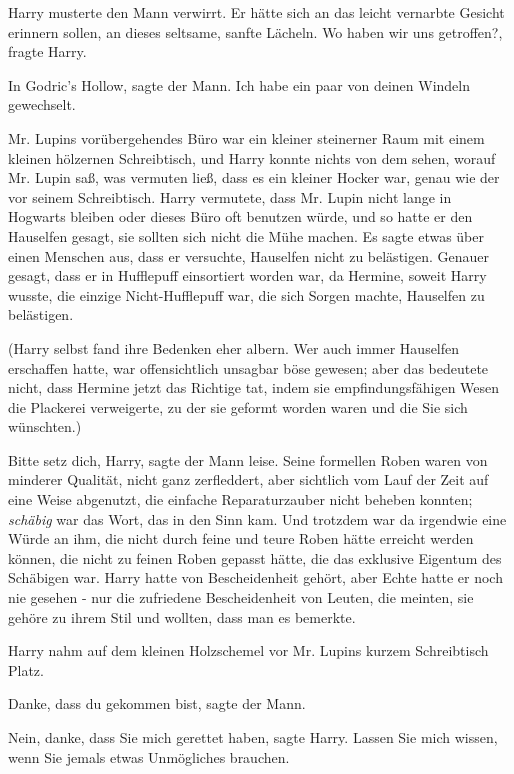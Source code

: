 Harry musterte den Mann verwirrt. Er hätte sich an das leicht vernarbte Gesicht
erinnern sollen, an dieses seltsame, sanfte Lächeln. \glqq{}Wo haben wir uns
getroffen?\grqq{}, fragte Harry.

\glqq{}In Godric's Hollow\grqq{}, sagte der Mann. \glqq{}Ich habe ein paar von
deinen Windeln gewechselt.\grqq{}

Mr. Lupins vorübergehendes Büro war ein kleiner steinerner Raum mit einem
kleinen hölzernen Schreibtisch, und Harry konnte nichts von dem sehen, worauf
Mr. Lupin saß, was vermuten ließ, dass es ein kleiner Hocker war, genau wie der
vor seinem Schreibtisch. Harry vermutete, dass Mr. Lupin nicht lange in Hogwarts
bleiben oder dieses Büro oft benutzen würde, und so hatte er den Hauselfen
gesagt, sie sollten sich nicht die Mühe machen. Es sagte etwas über einen
Menschen aus, dass er versuchte, Hauselfen nicht zu belästigen. Genauer gesagt,
dass er in Hufflepuff einsortiert worden war, da Hermine, soweit Harry wusste,
die einzige Nicht-Hufflepuff war, die sich Sorgen machte, Hauselfen zu
belästigen.

(Harry selbst fand ihre Bedenken eher albern. Wer auch immer Hauselfen
erschaffen hatte, war offensichtlich unsagbar böse gewesen; aber das bedeutete
nicht, dass Hermine jetzt das Richtige tat, indem sie empfindungsfähigen Wesen
die Plackerei verweigerte, zu der sie geformt worden waren und die Sie sich
wünschten.)

\glqq{}Bitte setz dich, Harry\grqq{}, sagte der Mann leise. Seine formellen Roben
waren von minderer Qualität, nicht ganz zerfleddert, aber sichtlich vom Lauf der
Zeit auf eine Weise abgenutzt, die einfache Reparaturzauber nicht beheben
konnten; \emph{schäbig} war das Wort, das in den Sinn kam. Und trotzdem war da
irgendwie eine Würde an ihm, die nicht durch feine und teure Roben hätte
erreicht werden können, die nicht zu feinen Roben gepasst hätte, die das
exklusive Eigentum des Schäbigen war. Harry hatte von Bescheidenheit gehört,
aber Echte hatte er noch nie gesehen - nur die zufriedene Bescheidenheit von
Leuten, die meinten, sie gehöre zu ihrem Stil und wollten, dass man es bemerkte.

Harry nahm auf dem kleinen Holzschemel vor Mr. Lupins kurzem Schreibtisch Platz.

\glqq{}Danke, dass du gekommen bist\grqq{}, sagte der Mann.

\glqq{}Nein, danke, dass Sie mich gerettet haben\grqq{}, sagte Harry. \glqq{}
Lassen Sie mich wissen, wenn Sie jemals etwas Unmögliches brauchen.\grqq{}

